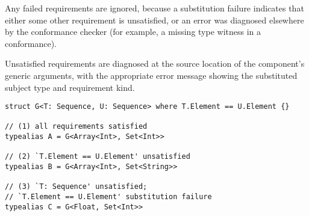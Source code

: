 \documentclass[../generics]{subfiles}
\begin{document}
Any failed requirements are ignored, because a substitution failure indicates that either some other requirement is unsatisfied, or an error was diagnosed elsewhere by the conformance checker (for example, a missing type witness in a conformance).

Unsatisfied requirements are diagnosed at the source location of the component's generic arguments, with the appropriate error message showing the substituted subject type and requirement kind.

\begin{listing}\label{unsatisfied requirements}
\begin{Verbatim}
struct G<T: Sequence, U: Sequence> where T.Element == U.Element {}

// (1) all requirements satisfied
typealias A = G<Array<Int>, Set<Int>>

// (2) `T.Element == U.Element' unsatisfied
typealias B = G<Array<Int>, Set<String>>

// (3) `T: Sequence' unsatisfied;
// `T.Element == U.Element' substitution failure
typealias C = G<Float, Set<Int>>
\end{Verbatim}
\end{listing}
\end{document}
